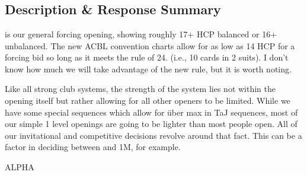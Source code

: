 \documentclass[tom-ari]{subfile}
\begin{document}
	
	\chapter[1C]{}
		
	\section{Description \& Response Summary}
	
	 is our general forcing opening, showing roughly 17+ HCP balanced or 16+ unbalanced.  The new ACBL convention charts allow for as low as 14 HCP for a forcing bid so long as it meets the rule of 24.  (i.e., 10 cards in 2 suits).  I don't know how much we will take advantage of the new rule, but it is worth noting.
	
	Like all strong club systems, the strength of the system lies not within the  opening itself but rather allowing for all other openers to be limited.  While we have some special sequences which allow for \"{u}ber max in TaJ sequences, most of our simple 1 level openings are going to be lighter than most people open.  All of our invitational and competitive decisions revolve around that fact.  This can be a factor in deciding between  and 1M, for example.
	
	\Huge{\color{red}ALPHA}
		
	\normalsize
	
	
\end{document}
